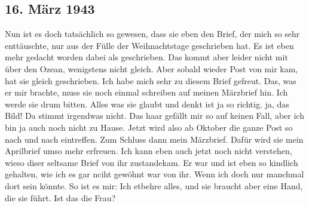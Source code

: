\subsection{16. M\"{a}rz 1943}

Nun ist es doch tats\"{a}chlich so gewesen, dass sie eben den Brief, der mich so sehr entt\"{a}uschte, nur aus der F\"{u}lle der Weihnachtstage geschrieben hat.
Es ist eben mehr gedacht worden dabei als geschrieben.
Das kommt aber leider nicht mit \"{u}ber den Ozean, wenigstens nicht gleich.
Aber sobald wieder Post von mir kam, hat sie gleich geschrieben.
Ich habe mich sehr zu diesem Brief gefreut.
Das, was er mir brachte, muss sie noch einmal schreiben auf meinen M\"{a}rzbrief hin.
Ich werde sie drum bitten.
Alles was sie glaubt und denkt ist ja so richtig.
ja, das Bild!
Da stimmt irgendwas nicht.
Das haar gef\"{a}llt mir so auf keinen Fall, aber ich bin ja auch noch nicht zu Hause.
Jetzt wird also ab Oktober die ganze Post so nach und nach eintreffen.
Zum Schluss dann mein M\"{a}rzbrief.
Daf\"{u}r wird sie mein Aprilbrief umso mehr erfreuen.
Ich kann eben auch jetzt noch nicht verstehen, wieso diser seltsame Brief von ihr zustandekam. Er war und ist eben so kindlich gehalten, wie ich es gar nciht gew\"{o}hnt war von ihr.
Wenn ich doch nur manchmal dort sein k\"{o}nnte.
So ist es mir: Ich etbehre alles, und sie braucht aber eine Hand, die sie f\"{u}hrt.
Ist das die Frau?

\clearpage
